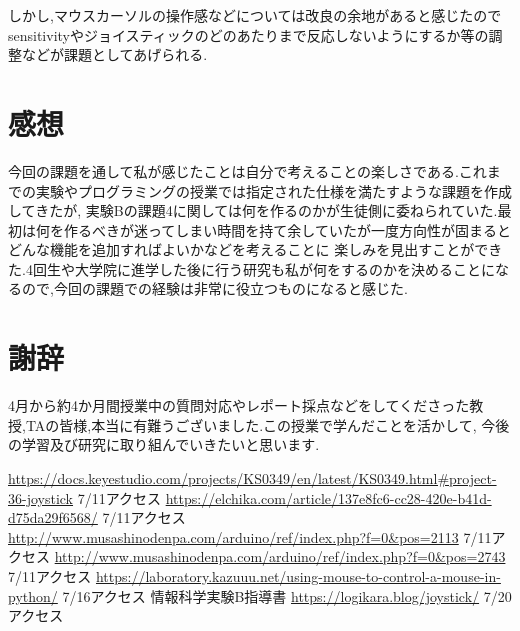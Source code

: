 \documentclass[dvipdfmx]{jarticle}
\begin{document}
しかし,マウスカーソルの操作感などについては改良の余地があると感じたのでsensitivityやジョイスティックのどのあたりまで反応しないようにするか等の調整などが課題としてあげられる.
\section{感想}
今回の課題を通して私が感じたことは自分で考えることの楽しさである.これまでの実験やプログラミングの授業では指定された仕様を満たすような課題を作成してきたが,
実験Bの課題4に関しては何を作るのかが生徒側に委ねられていた.最初は何を作るべきが迷ってしまい時間を持て余していたが一度方向性が固まるとどんな機能を追加すればよいかなどを考えることに
楽しみを見出すことができた.4回生や大学院に進学した後に行う研究も私が何をするのかを決めることになるので,今回の課題での経験は非常に役立つものになると感じた.
\section{謝辞}
4月から約4か月間授業中の質問対応やレポート採点などをしてくださった教授,TAの皆様,本当に有難うございました.この授業で学んだことを活かして,
今後の学習及び研究に取り組んでいきたいと思います.
\begin{thebibliography}{99}
     \url{https://docs.keyestudio.com/projects/KS0349/en/latest/KS0349.html#project-36-joystick} 7/11アクセス
     \url{https://elchika.com/article/137e8fc6-cc28-420e-b41d-d75da29f6568/} 7/11アクセス
     \url{http://www.musashinodenpa.com/arduino/ref/index.php?f=0&pos=2113} 7/11アクセス
     \url{http://www.musashinodenpa.com/arduino/ref/index.php?f=0&pos=2743} 7/11アクセス
     \url{https://laboratory.kazuuu.net/using-mouse-to-control-a-mouse-in-python/} 7/16アクセス
     情報科学実験B指導書
     \url{https://logikara.blog/joystick/} 7/20アクセス
\end{thebibliography}
\end{document}
